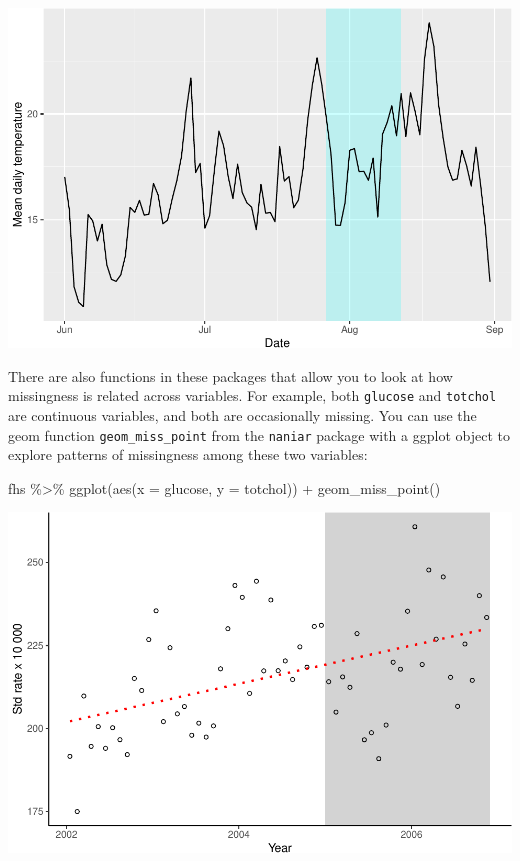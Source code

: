 \documentclass[
]{book}
\newenvironment{Shaded}{\begin{snugshade}}{\end{snugshade}}
\newcommand{\AttributeTok}[1]{\textcolor[rgb]{0.77,0.63,0.00}{#1}}
\newcommand{\FunctionTok}[1]{\textcolor[rgb]{0.00,0.00,0.00}{#1}}
\newcommand{\NormalTok}[1]{#1}
\newcommand{\SpecialCharTok}[1]{\textcolor[rgb]{0.00,0.00,0.00}{#1}}
\begin{document}
\includegraphics{adv_epi_analysis_files/figure-latex/unnamed-chunk-122-1.pdf}

There are also functions in these packages that allow you to look at how
missingness is related across variables. For example, both \texttt{glucose} and
\texttt{totchol} are continuous variables, and both are occasionally missing. You
can use the geom function \texttt{geom\_miss\_point} from the \texttt{naniar} package
with a ggplot object to explore patterns of missingness among these two
variables:

\begin{Shaded}
\begin{Highlighting}[]
\NormalTok{fhs }\SpecialCharTok{\%\textgreater{}\%} 
  \FunctionTok{ggplot}\NormalTok{(}\FunctionTok{aes}\NormalTok{(}\AttributeTok{x =}\NormalTok{ glucose, }\AttributeTok{y =}\NormalTok{ totchol)) }\SpecialCharTok{+} 
  \FunctionTok{geom\_miss\_point}\NormalTok{()}
\end{Highlighting}
\end{Shaded}

\includegraphics{adv_epi_analysis_files/figure-latex/unnamed-chunk-123-1.pdf}
\end{document}
